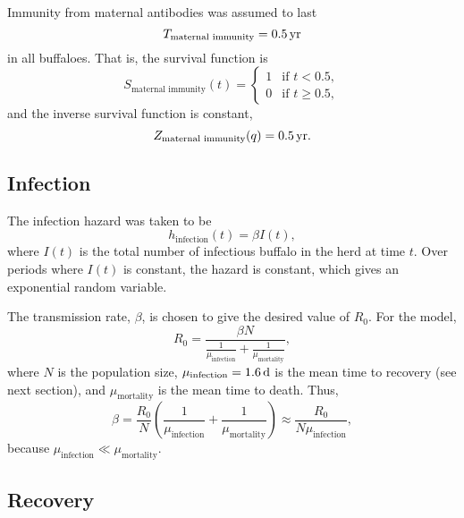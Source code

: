 \documentclass{article}
\begin{document}
Immunity from maternal antibodies was assumed to last
\begin{equation}
  T_{\text{maternal immunity}} = \unit[0.5]{yr}
\end{equation}
in all buffaloes.  That is, the survival function is
\begin{equation}
  S_{\text{maternal immunity}}(t) =
  \begin{cases}
    1 & \text{if $t < 0.5$},
    \\
    0 & \text{if $t \geq 0.5$},
  \end{cases}
\end{equation}
and the inverse survival function is constant,
\begin{equation}
  Z_{\text{maternal immunity}}(q) = \unit[0.5]{yr}.
\end{equation}


\subsection{Infection}

The infection hazard was taken to be
\begin{equation}
  h_{\text{infection}}(t) = \beta I(t),
\end{equation}
where $I(t)$ is the total number of infectious buffalo in the herd at
time $t$.  Over periods where $I(t)$ is constant, the hazard is
constant, which gives an exponential random variable.

The transmission rate, $\beta$, is chosen to give the desired value of
$R_0$.  For the model,
\begin{equation}
  R_0 = \frac{\beta N}{\frac{1}{\mu_{\text{infection}}}
    + \frac{1}{\mu_{\text{mortality}}}},
\end{equation}
where $N$ is the population size,
$\mu_{\text{infection}} = \unit[1.6]{d}$ is the mean time to recovery
(see next section), and $\mu_{\text{mortality}}$ is the mean time to
death.  Thus,
\begin{equation}
  \beta = \frac{R_0}{N}
  \left(\frac{1}{\mu_{\text{infection}}} +
    \frac{1}{\mu_{\text{mortality}}}\right)
  \approx \frac{R_0}{N \mu_{\text{infection}}},
\end{equation}
because $\mu_{\text{infection}} \ll \mu_{\text{mortality}}$.

\subsection{Recovery}
\end{document}
